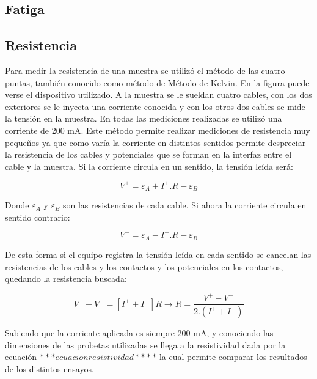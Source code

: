 \documentclass[a4paper,12pt,fleqn,twoside,openany]{book}
\begin{document}
\subsection{Fatiga}

\subsection{Resistencia}


Para medir la resistencia de una muestra se utilizó el método de las cuatro puntas, también conocido como método de Método de Kelvin. En la figura puede 
verse el dispositivo utilizado. A la muestra se le sueldan cuatro cables, con los dos exteriores se le inyecta una corriente conocida y con los otros dos 
cables se mide la tensión en la muestra. En todas las mediciones realizadas se utilizó una corriente de 200 mA.
Este método permite realizar mediciones de resistencia muy pequeños ya que como varía la corriente en distintos sentidos permite despreciar la resistencia de 
los cables y potenciales que se forman en la interfaz entre el cable y la muestra. Si la corriente circula en un sentido, la tensión leída será:

\begin{equation}
 V^+= \varepsilon_A +I^+ . R - \varepsilon_B 
\end{equation}

Donde $\varepsilon_A$ y $\varepsilon_B$ son las resistencias de cada cable. Si ahora la corriente circula en sentido contrario:

\begin{equation}
 V^-= \varepsilon_A -I^- . R - \varepsilon_B 
\end{equation}

De esta forma si el equipo registra la tensión leída en cada sentido se cancelan las resistencias de los cables y los contactos y los potenciales 
en los contactos, quedando la resistencia buscada:

\begin{equation}
 V^+ - V^-= [I^+ + I^-] R \longrightarrow R=\frac{V^+ - V^-}{2.(I^+ + I^-)}
\end{equation}

Sabiendo que la corriente aplicada es siempre 200 mA, y conociendo las dimensiones de las probetas utilizadas se llega a la resistividad dada por la 
ecuación $***ecuacion resistividad****$ la cual permite comparar los resultados de los distintos ensayos.
\end{document}
